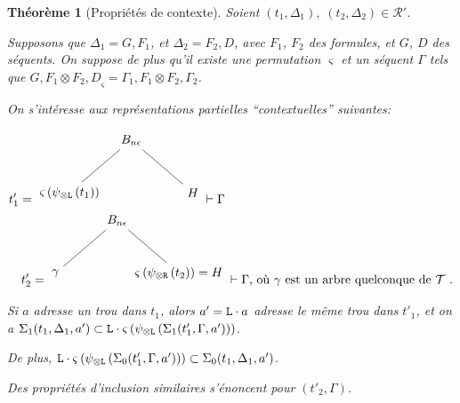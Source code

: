 \documentclass[11pt,a4paper]{article}
\theoremstyle{plain}
\newtheorem{theorem}{Théorème}
\theoremstyle{definition}
\theoremstyle{remark}
\newcommand*{\tensor}{\otimes}
\newcommand*{\someperm}{\varsigma}
\newcommand*{\sequent}{\Gamma}
\newcommand*{\sequentbis}{\Delta}
\newcommand*{\Left}{\textnormal{\texttt{L}}}
\newcommand*{\Right}{\textnormal{\texttt{R}}}
\newcommand*{\trees}{\ensuremath{\mathcal{T}}}
\newcommand*{\representationspartial}{\ensuremath{\mathcal{R'}}}
\newcommand*{\unknown}{H}
\newcommand*{\lowapprox}{\ensuremath{\Sigma_0}}
\newcommand*{\highapprox}{\ensuremath{\Sigma_1}}
\begin{document}
\begin{theorem}[Propriétés de contexte]
    \label{context_prop}
    Soient $(t_1, \sequentbis_1), \;  (t_2, \sequentbis_2) \in \representationspartial$. 
    
    Supposons que $\sequentbis_1 = G, F_1$, et $\sequentbis_2 = F_2, D$, avec $F_1$, $F_2$ des formules, et $G$, $D$ des séquents. On suppose de plus qu'il existe une permutation $\someperm$ et un séquent $\sequent$ tels que ${G, F_1 \tensor F_2, D}_\someperm = \sequent_1, F_1 \tensor F_2, \sequent_2$.

    On s'intéresse aux représentations partielles ``contextuelles'' suivantes:

    \begin{align*}
        \begin{multlined}
            t'_1 = \begin{tikzpicture}%
            [level distance=1.5cm,
            level 1/.style={sibling distance=3.5cm}]
            \node {$B_{n \epsilon}$}
                child {node {$\someperm \left( \psi_{\tensor\Left} \left(
                t_1\right) \right)$}}
                child {node {$\unknown$}
            };
            \end{tikzpicture}
            \vdash \sequent \\
            t'_2 = \begin{tikzpicture}%
            [level distance=1.5cm,
            level 1/.style={sibling distance=3.5cm}]
            \node {$B_{n \epsilon}$}
                child {node {$\gamma$}}
                child {node {$\someperm \left( \psi_{\tensor\Right} \left(t_2\right) \right) = \unknown$}
            };
            \end{tikzpicture}
            \vdash \sequent \text{, où $\gamma$ est un arbre quelconque de $\trees$ }.
        \end{multlined}
    \end{align*}
    
    Si $a$ adresse un trou dans $t_1$, alors $a' = \Left \cdot a$ adresse le même trou dans $t'_1$, et on a $\highapprox(t_1, \sequentbis_1, a') \subset \Left \cdot \someperm \left( \psi_{\tensor\Left} \left(\highapprox(t'_1, \sequent, a')\right) \right)$. 
    
    De plus, $\Left \cdot \someperm \left( \psi_{\tensor\Left} \left(\lowapprox(t'_1, \sequent, a')\right) \right) \subset \lowapprox(t_1, \sequentbis_1, a')$.
    
    Des propriétés d'inclusion similaires s'énoncent pour $(t'_2, \sequent)$.
\end{theorem}
\end{document}
